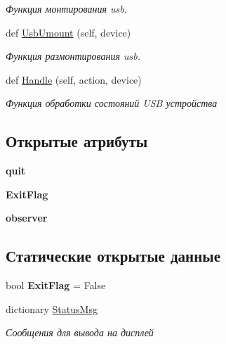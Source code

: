 \begin{DoxyCompactItemize}
\begin{DoxyCompactList}\small\item\em Функция монтирования usb. \end{DoxyCompactList}\item 
def \mbox{\hyperlink{classisofc-service-2_1_1DeviceHandler_a72e367f0aca59a59e9374c8bda9b8806}{Usb\+Umount}} (self, device)
\begin{DoxyCompactList}\small\item\em Функция размонтирования usb. \end{DoxyCompactList}\item 
def \mbox{\hyperlink{classisofc-service-2_1_1DeviceHandler_ab2f222dfae5bd17058e6257f7ff71d87}{Handle}} (self, action, device)
\begin{DoxyCompactList}\small\item\em Функция обработки состояний U\+SB устройства \end{DoxyCompactList}\end{DoxyCompactItemize}
\subsection*{Открытые атрибуты}
\begin{DoxyCompactItemize}
\item 
\mbox{\label{classisofc-service-2_1_1DeviceHandler_a792efe5fc64a91a00119303cbe3387c1}} 
{\bfseries quit}
\item 
\mbox{\label{classisofc-service-2_1_1DeviceHandler_a6194b1773ff05625d2a40bd17cca5cc6}} 
{\bfseries Exit\+Flag}
\item 
\mbox{\label{classisofc-service-2_1_1DeviceHandler_ad98be784f80d6ba47fa457a7ad43513c}} 
{\bfseries observer}
\end{DoxyCompactItemize}
\subsection*{Статические открытые данные}
\begin{DoxyCompactItemize}
\item 
\mbox{\label{classisofc-service-2_1_1DeviceHandler_afbb62a76f9959fc47a13559eb1e363cf}} 
bool {\bfseries Exit\+Flag} = False
\item 
dictionary \mbox{\hyperlink{classisofc-service-2_1_1DeviceHandler_a95f5cb075a653330abd901ce95f715a8}{Status\+Msg}}
\begin{DoxyCompactList}\small\item\em Сообщения для вывода на дисплей \end{DoxyCompactList}\end{DoxyCompactItemize}


